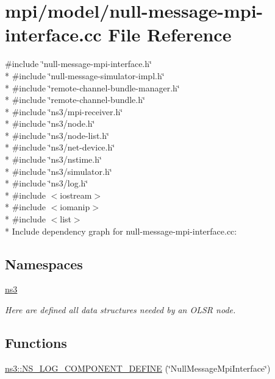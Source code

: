 \hypertarget{null-message-mpi-interface_8cc}{}\section{mpi/model/null-\/message-\/mpi-\/interface.cc File Reference}
\label{null-message-mpi-interface_8cc}
{\ttfamily \#include \char`\"{}null-\/message-\/mpi-\/interface.\+h\char`\"{}}\\*
{\ttfamily \#include \char`\"{}null-\/message-\/simulator-\/impl.\+h\char`\"{}}\\*
{\ttfamily \#include \char`\"{}remote-\/channel-\/bundle-\/manager.\+h\char`\"{}}\\*
{\ttfamily \#include \char`\"{}remote-\/channel-\/bundle.\+h\char`\"{}}\\*
{\ttfamily \#include \char`\"{}ns3/mpi-\/receiver.\+h\char`\"{}}\\*
{\ttfamily \#include \char`\"{}ns3/node.\+h\char`\"{}}\\*
{\ttfamily \#include \char`\"{}ns3/node-\/list.\+h\char`\"{}}\\*
{\ttfamily \#include \char`\"{}ns3/net-\/device.\+h\char`\"{}}\\*
{\ttfamily \#include \char`\"{}ns3/nstime.\+h\char`\"{}}\\*
{\ttfamily \#include \char`\"{}ns3/simulator.\+h\char`\"{}}\\*
{\ttfamily \#include \char`\"{}ns3/log.\+h\char`\"{}}\\*
{\ttfamily \#include $<$iostream$>$}\\*
{\ttfamily \#include $<$iomanip$>$}\\*
{\ttfamily \#include $<$list$>$}\\*
Include dependency graph for null-\/message-\/mpi-\/interface.cc\+:
\subsection*{Namespaces}
\begin{DoxyCompactItemize}
\item 
 \hyperlink{namespacens3}{ns3}
\begin{DoxyCompactList}\small\item\em Here are defined all data structures needed by an O\+L\+SR node. \end{DoxyCompactList}\end{DoxyCompactItemize}
\subsection*{Functions}
\begin{DoxyCompactItemize}
\item 
\hyperlink{namespacens3_a23b1a93cd652beb5a768aaa08b569561}{ns3\+::\+N\+S\+\_\+\+L\+O\+G\+\_\+\+C\+O\+M\+P\+O\+N\+E\+N\+T\+\_\+\+D\+E\+F\+I\+NE} (\char`\"{}Null\+Message\+Mpi\+Interface\char`\"{})
\end{DoxyCompactItemize}
